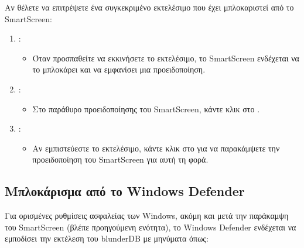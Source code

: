 \documentclass[letterpaper,10pt,greek]{sphinxmanual}
\begin{document}
\sphinxAtStartPar
Αν θέλετε να επιτρέψετε ένα συγκεκριμένο εκτελέσιμο που έχει μπλοκαριστεί από το SmartScreen:
\begin{enumerate}
%
\item {} 
\sphinxAtStartPar
{}:
\begin{itemize}
\item {} 
\sphinxAtStartPar
Όταν προσπαθείτε να εκκινήσετε το εκτελέσιμο, το SmartScreen ενδέχεται να το μπλοκάρει και να εμφανίσει μια προειδοποίηση.

\end{itemize}

\item {} 
\sphinxAtStartPar
{}:
\begin{itemize}
\item {} 
\sphinxAtStartPar
Στο παράθυρο προειδοποίησης του SmartScreen, κάντε κλικ στο .

\end{itemize}

\item {} 
\sphinxAtStartPar
{}:
\begin{itemize}
\item {} 
\sphinxAtStartPar
Αν εμπιστεύεστε το εκτελέσιμο, κάντε κλικ στο  για να παρακάμψετε την προειδοποίηση του SmartScreen για αυτή τη φορά.

\end{itemize}

\end{enumerate}


\subsection{Μπλοκάρισμα από το Windows Defender}
\label{\detokenize{annexe_windows_securite:blocage-windows-defender}}
\sphinxAtStartPar
Για ορισμένες ρυθμίσεις ασφαλείας των Windows, ακόμη και μετά την παράκαμψη του SmartScreen (βλέπε προηγούμενη ενότητα), το Windows Defender ενδέχεται να εμποδίσει την εκτέλεση του blunderDB με μηνύματα όπως:

\begin{figure}[htbp]
\centering

\noindent{}
\end{figure}
\end{document}
